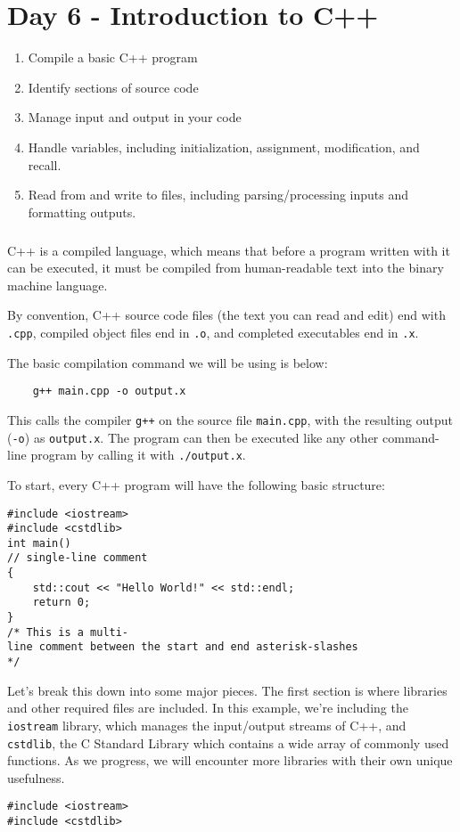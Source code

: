 \chapter{Day 6 - Introduction to C++}
\begin{Goals}
\begin{enumerate}
    \item Compile a basic C++ program
    \item Identify sections of source code
    \item Manage input and output in your code
    \item Handle variables, including initialization, assignment, modification, and recall.
    \item Read from and write to files, including parsing/processing inputs and formatting outputs.
\end{enumerate}
\end{Goals}
\paragraph{}C++ is a compiled language, which means that before a program written with it can be executed, it must be compiled from human-readable text into the binary machine language.

By convention, C++ source code files (the text you can read and edit) end with \texttt{.cpp}, compiled object files end in \texttt{.o}, and completed executables end in \texttt{.x}.

The basic compilation command we will be using is below:

\begin{verbatim}
    g++ main.cpp -o output.x
\end{verbatim}

This calls the compiler \texttt{g++} on the source file \texttt{main.cpp}, with the resulting output (\texttt{-o}) as \texttt{output.x}.  The program can then be executed like any other command-line program by calling it with \texttt{./output.x}.

To start, every C++ program will have the following basic structure:

\begin{verbatim}
#include <iostream>
#include <cstdlib>
int main()
// single-line comment
{
    std::cout << "Hello World!" << std::endl;
    return 0;
}
/* This is a multi-
line comment between the start and end asterisk-slashes
*/
\end{verbatim}

Let's break this down into some major pieces.  The first section is where libraries and other required files are included.  In this example, we're including the \texttt{iostream} library, which manages the input/output streams of C++, and \texttt{cstdlib}, the C Standard Library which contains a wide array of commonly used functions.  As we progress, we will encounter more libraries with their own unique usefulness.
\begin{verbatim}
#include <iostream>
#include <cstdlib>
\end{verbatim}

